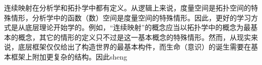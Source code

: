 
连续映射在分析学和拓扑学中都有定义。从逻辑上来说，度量空间是拓扑空间的特殊情形，分析学中的函数（数）空间是度量空间的特殊情形。因此，更好的学习方式是从底层理论开始学的。例如，“连续映射”的概念应当以拓扑学中的概念为最基本的概念，其它的情形的定义只不过是这一基本概念的特殊情形。然而，从现实来说，底层框架仅仅给出了构造世界的最基本构件，而生命（意识）的诞生需要在基本框架上附加更复杂的结构。因此sheng



